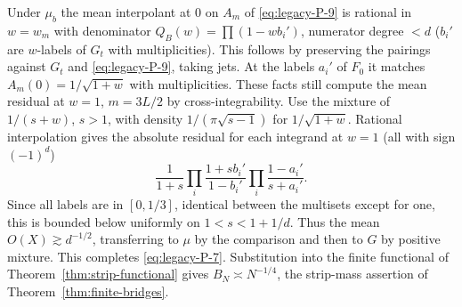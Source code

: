 Under $\mu_b$ the mean interpolant at 0 on $A_m$ of \eqref{eq:legacy-P-9} is rational in $w=w_m$ with denominator $Q_B(w)=\prod(1-w b_i')$, numerator degree $<d$ ($b_i'$ are $w$-labels of $G_t$ with multiplicities). This follows by preserving the pairings against $G_t$ and \eqref{eq:legacy-P-9}, taking jets. At the labels $a_i'$ of $F_0$ it matches $A_m(0)=1/\sqrt{1+w}$ with multiplicities. These facts still compute the mean residual at $w=1$, $m=3L/2$ by cross-integrability. Use the mixture of $1/(s+w)$, $s>1$, with density $1/(\pi\sqrt{s-1})$ for $1/\sqrt{1+w}$. Rational interpolation gives the absolute residual for each integrand at $w=1$ (all with sign $(-1)^d$)
\[
 \frac{1}{1+s}\prod_i\frac{1+s b_i'}{1-b_i'}\prod_i\frac{1-a_i'}{s+a_i'}.
\]
Since all labels are in $[0,1/3]$, identical between the multisets except for one, this is bounded below uniformly on $1<s<1+1/d$. Thus the mean $O(X)\gtrsim d^{-1/2}$, transferring to $\mu$ by the comparison and then to $G$ by positive mixture. This completes \eqref{eq:legacy-P-7}. Substitution into the finite functional of Theorem~\ref{thm:strip-functional} gives $B_N\asymp N^{-1/4}$, the strip-mass assertion of Theorem~\ref{thm:finite-bridges}.

